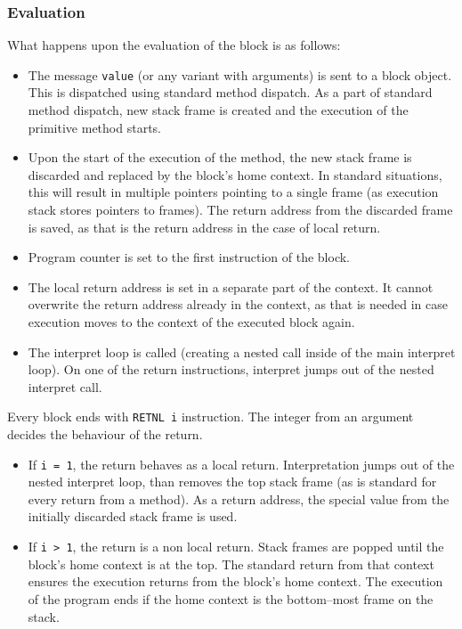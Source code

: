 \documentclass[thesis=M,english]{FITthesis}[2019/12/23]
\begin{document}
\subsubsection{Evaluation}
What happens upon the evaluation of the block is as follows:
\begin{itemize}
	\item The message \texttt{value} (or any variant with arguments) is sent to a block object. This is dispatched using standard method
		dispatch. As a part of standard method dispatch, new stack frame is created and the execution of the primitive method starts.
	\item Upon the start of the execution of the method, the new stack frame is discarded and replaced by the block's home context. In
		standard situations, this will result in multiple pointers pointing to a single frame (as execution stack stores pointers to frames).
		The return address from the discarded frame is saved, as that is the return address in the case of local return.
	\item Program counter is set to the first instruction of the block.
	\item The local return address is set in a separate part of the context. It cannot overwrite the return address already in the context,
		as that is needed in case execution moves to the context of the executed block again.
	\item The interpret loop is called (creating a nested call inside of the main interpret loop). On one of the return instructions, 
		interpret jumps out of the nested interpret call. 
\end{itemize}

Every block ends with \texttt{RETNL i} instruction. The integer from an argument decides the behaviour of the return.
\begin{itemize}
	\item If \texttt{i = 1}, the return behaves as a local return. Interpretation jumps out of the nested interpret loop, than removes
		the top stack frame (as is standard for every return from a method). As a return address, the special value from the initially
		discarded stack frame is used.
	\item If \texttt{i > 1}, the return is a non local return. Stack frames are popped until the block's home context is at the top.
		The standard return from that context ensures the execution returns from the block's home context. The execution of the program
		ends if the home context is the bottom--most frame on the stack.
\end{itemize}
\end{document}
